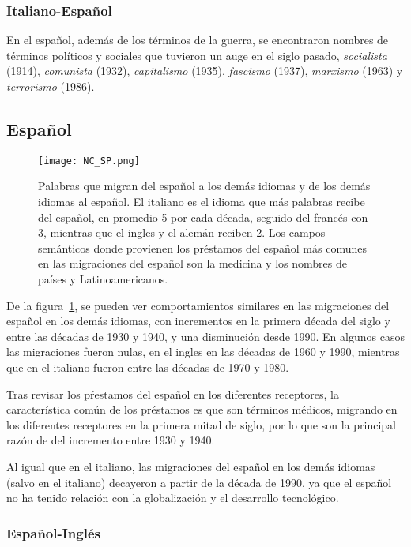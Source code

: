 \subsubsection*{Italiano-Español}%

En el español, además de los términos de la guerra, se encontraron nombres de términos políticos y sociales que tuvieron un auge en el siglo pasado,  \textit{socialista} (1914), \textit{comunista} (1932), \textit{capitalismo} (1935), \textit{fascismo} (1937),  \textit{marxismo} (1963) y \textit{terrorismo} (1986). 



\subsection{Español}%

\begin{figure}[h!] %
	\centering
	\texttt{[image: NC\_SP.png]}
	\caption{Palabras que migran del español a los demás idiomas y de los demás idiomas al español. El italiano es el idioma que más palabras recibe del español, en promedio 5 por cada década, seguido del francés con 3, mientras que el ingles y el alemán reciben 2. Los campos semánticos donde provienen los préstamos del español  más comunes en las migraciones del español son la medicina y los nombres de países y Latinoamericanos. }
	\label{fig.NC_SP}
\end{figure} %


De la figura~\ref{fig.NC_SP}, se pueden ver comportamientos similares en las migraciones del español en los demás idiomas, con incrementos en la primera década del siglo y entre las décadas de 1930 y 1940,  y una disminución desde 1990. En algunos casos las migraciones fueron nulas, en el ingles en las décadas de 1960 y 1990, mientras que en el italiano fueron entre las décadas de 1970  y 1980. 

Tras revisar los pŕestamos del español en los diferentes receptores,  la característica común de los préstamos es que son términos médicos, migrando en los diferentes receptores en la primera mitad de siglo, por lo que son la principal razón de del incremento entre 1930 y 1940. 

Al igual que en el italiano, las migraciones del español en los demás idiomas (salvo en el italiano) decayeron a partir de la década de 1990, ya que el español no ha tenido relación con la globalización y el desarrollo tecnológico. 

\subsubsection*{Español-Inglés}%

